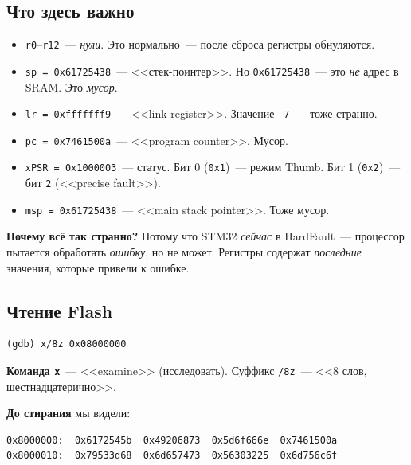\subsection{Что здесь важно}

\begin{itemize}
    \item \texttt{r0}–\texttt{r12}~--- \emph{нули}.
          Это нормально~--- после сброса регистры обнуляются.
    \item \texttt{sp = 0x61725438}~--- <<стек-поинтер>>.
          Но \texttt{0x61725438}~--- это \emph{не} адрес
          в SRAM. Это \emph{мусор}.
    \item \texttt{lr = 0xfffffff9}~--- <<link register>>.
          Значение \texttt{-7}~--- тоже странно.
    \item \texttt{pc = 0x7461500a}~--- <<program counter>>.
          Мусор.
    \item \texttt{xPSR = 0x1000003}~--- статус. Бит 0
          (\texttt{0x1})~--- режим Thumb. Бит 1
          (\texttt{0x2})~--- бит \texttt{2} (<<precise
          fault>>).
    \item \texttt{msp = 0x61725438}~--- <<main stack pointer>>.
          Тоже мусор.
\end{itemize}

\begin{warnbox}
\textbf{Почему всё так странно?} Потому что STM32
\emph{сейчас} в HardFault~--- процессор пытается
обработать \emph{ошибку}, но не может. Регистры содержат
\emph{последние} значения, которые привели к ошибке.
\end{warnbox}

\subsection{Чтение Flash}

\begin{verbatim}
(gdb) x/8z 0x08000000
\end{verbatim}

\textbf{Команда \texttt{x}}~--- <<examine>> (исследовать).
Суффикс \texttt{/8z}~--- <<8 слов, шестнадцатерично>>.

\textbf{До стирания} мы видели:

\begin{verbatim}
0x8000000:	0x6172545b	0x49206873	0x5d6f666e	0x7461500a
0x8000010:	0x79533d68	0x6d657473	0x56303225	0x6d756c6f
\end{verbatim}

